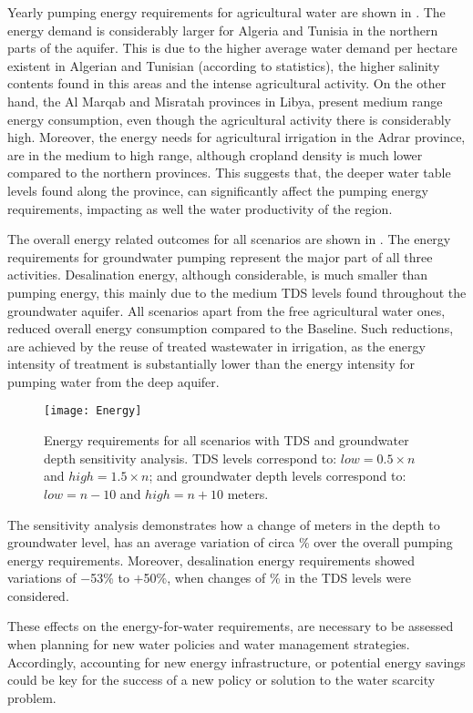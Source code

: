 Yearly pumping energy requirements for agricultural water are shown in . The energy demand is considerably larger for Algeria and Tunisia in the northern parts of the aquifer. This is due to the higher average water demand per hectare existent in Algerian and Tunisian (according to statistics), the higher salinity contents found in this areas and the intense agricultural activity. On the other hand, the Al Marqab and Misratah provinces in Libya, present medium range energy consumption, even though the agricultural activity there is considerably high. Moreover, the energy needs for agricultural irrigation in the Adrar province, are in the medium to high range, although cropland density is much lower compared to the northern provinces. This suggests that, the deeper water table levels found along the province, can significantly affect the pumping energy requirements, impacting as well the water productivity of the region.

The overall energy related outcomes for all scenarios are shown in . The energy requirements for groundwater pumping represent the major part of all three activities. Desalination energy, although considerable, is much smaller than pumping energy, this mainly due to the medium TDS levels found throughout the groundwater aquifer. All scenarios apart from the free agricultural water ones, reduced overall energy consumption compared to the Baseline. Such reductions, are achieved by the reuse of treated wastewater in irrigation, as the energy intensity of treatment is substantially lower than the energy intensity for pumping water from the deep aquifer.

\begin{figure*}[!t]
\texttt{[image: Energy]}
\caption{Energy requirements for all scenarios with TDS and groundwater depth sensitivity analysis. TDS levels correspond to: $low=0.5\times n$ and $high=1.5\times n$; and groundwater depth levels correspond to: $low=n-10$ and $high=n+10$ meters.}
\label{fig:energy}
\end{figure*}

The sensitivity analysis demonstrates how a change of  meters in the depth to groundwater level, has an average variation of circa \% over the overall pumping energy requirements. Moreover, desalination energy requirements showed variations of $-$53\% to $+$50\%, when changes of \% in the TDS levels were considered.

These effects on the energy-for-water requirements, are necessary to be assessed when planning for new water policies and water management strategies. Accordingly, accounting for new energy infrastructure, or potential energy savings could be key for the success of a new policy or solution to the water scarcity problem.